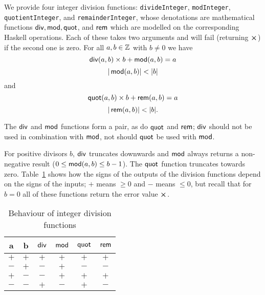 
\label{note:integer-division-functions}
We provide four integer division functions: \texttt{divideInteger},
\texttt{modInteger}, \texttt{quotientInteger}, and \texttt{remainderInteger},
whose denotations are mathematical functions $\operatorname{\mathsf{div}}, \operatorname{\mathsf{mod}}, \operatorname{\mathsf{quot}}$, and
$\operatorname{\mathsf{rem}}$ which are modelled on the corresponding Haskell operations. Each of
these takes two arguments and will fail (returning $\errorX$) if the second one
is zero.  For all $a,b \in \mathbb{Z}$ with $b \ne 0$ we have
$$
\operatorname{\mathsf{div}}(a,b) \times b + \operatorname{\mathsf{mod}}(a,b) = a
$$
$$
  |\operatorname{\mathsf{mod}}(a,b)| < |b|
$$\noindent and
$$
  \operatorname{\mathsf{quot}}(a,b) \times b + \operatorname{\mathsf{rem}}(a,b) = a
$$
$$
  |\operatorname{\mathsf{rem}}(a,b)| < |b|.
$$

\noindent The $\operatorname{\mathsf{div}}$ and $\operatorname{\mathsf{mod}}$ functions form a pair, as do $\operatorname{\mathsf{quot}}$ and $\operatorname{\mathsf{rem}}$;
$\operatorname{\mathsf{div}}$ should not be used in combination with $\operatorname{\mathsf{mod}}$, not should $\operatorname{\mathsf{quot}}$ be used
with $\operatorname{\mathsf{mod}}$.

For positive divisors $b$, $\operatorname{\mathsf{div}}$ truncates downwards and $\operatorname{\mathsf{mod}}$ always
returns a non-negative result ($0 \leq \operatorname{\mathsf{mod}}(a,b) \leq b-1$).  The $\operatorname{\mathsf{quot}}$
function truncates towards zero.  Table~\ref{table:integer-division-signs} shows
how the signs of the outputs of the division functions depend on the signs of
the inputs; $+$ means $\geq 0$ and $-$ means $\leq 0$, but recall that for $b=0$
all of these functions return the error value $\errorX$.
\begin{table}[H]
  \centering
    \begin{tabular}{|cc|cc|cc|}
        \hline
        a & b & $\operatorname{\mathsf{div}}$ & $\operatorname{\mathsf{mod}}$ & $\operatorname{\mathsf{quot}}$ & $\operatorname{\mathsf{rem}}$ \\
        \hline
        $+$ & $+$ & $+$ & $+$ & $+$ & $+$ \\
        $-$ & $+$ & $-$ & $+$ & $-$ & $-$ \\
        $+$ & $-$ & $-$ & $+$ & $+$ & $+$ \\
        $-$ & $-$ & $+$ & $-$ & $+$ & $-$ \\
        \hline
        \end{tabular}
   \caption{Behaviour of integer division functions}
   \label{table:integer-division-signs}
\end{table}

